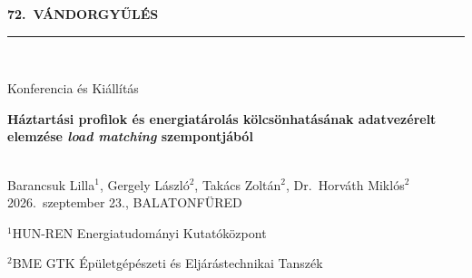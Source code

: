 \documentclass[aspectratio=169]{beamer}
\begin{document}
{
\begin{frame}
\begin{LARGE}
\color{white}
\MakeUppercase{\textbf{72.~Vándorgyűlés}}
\end{LARGE}

\vspace{-0.5ex}
\color{mediumblue}\rule{0.52\textwidth}{1.5pt} \\

\begin{Large}
Konferencia és Kiállítás
\end{Large}

\vspace{3.5ex}
\hspace{-0.5cm}
\begin{flushleft}
\begin{LARGE}
\textbf{\color{white}Háztartási profilok és energiatárolás kölcsönhatásának adatvezérelt elemzése \textit{load matching} szempontjából}
\end{LARGE}
\vspace{1.5ex}
\\
{\color{white}Barancsuk Lilla$^1$, Gergely László$^2$, Takács Zoltán$^2$, Dr.~Horváth Miklós$^2$}
\vspace{1.5ex}
\\
{\color{white} \small{2026.~szeptember 23., BALATONFÜRED}}

\vspace{0.5ex}

{\footnotesize\color{white}$^1$HUN-REN Energiatudományi Kutatóközpont}

{\footnotesize\color{white}$^2$BME GTK Épületgépészeti és Eljárástechnikai Tanszék}
\end{flushleft}
\end{frame}
}
\end{document}
